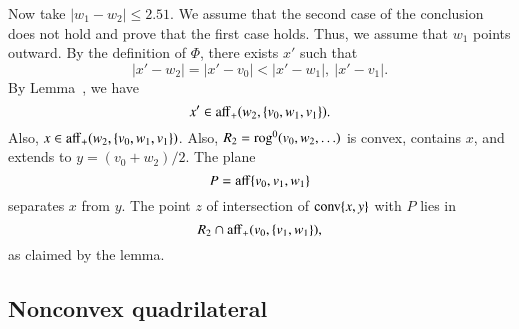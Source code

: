 \begin{tarskidata}
\begin{tarski}
\begin{proved}
Now take $|w_1-w_2|\le 2.51$. 
We assume that the second case of the conclusion does not hold and prove that
the first case holds.  Thus, we assume that $w_1$ points outward.
By the definition of $\Phi$, there exists $x'$ such
that 
$$|x' - w_2|=|x'-v_0| < |x'-w_1|,\ |x'-v_1|.$$
By Lemma~, we have
$$
  x' \in {\operatorname{aff}}_+(w_2,\{v_0,w_1,v_1\}).
$$
Also, $x \in{\operatorname{aff}}_+(w_2,\{v_0,w_1,v_1\})$.
Also, $R_2 = {\operatorname{rog}}^0(v_0,w_2,\ldots)$
is convex, contains $x$, and extends to $y=(v_0+w_2)/2$.  
The plane
$$P  ={\operatorname{aff}}\{v_0,v_1,w_1\}$$ separates $x$ from $y$.  The point $z$
of intersection of ${\operatorname{conv}}\{x,y\}$ with $P$ lies in
   $$R_2 \cap {\operatorname{aff}}_+(v_0,\{v_1,w_1\}),$$
as claimed by the lemma.
\swallowed\end{proved}
\end{tarski}


























\begin{tarski}
\section{Nonconvex quadrilateral}


\end{tarski}
\end{tarskidata}
